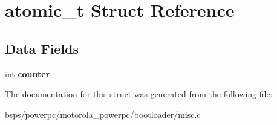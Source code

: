 \hypertarget{structatomic__t}{}\section{atomic\+\_\+t Struct Reference}
\label{structatomic__t}
\subsection*{Data Fields}
\begin{DoxyCompactItemize}
\item 
\mbox{\label{structatomic__t_a777982d8b9b8d7c4f1f41b318da10675}} 
int {\bfseries counter}
\end{DoxyCompactItemize}


The documentation for this struct was generated from the following file\+:\begin{DoxyCompactItemize}
\item 
bsps/powerpc/motorola\+\_\+powerpc/bootloader/misc.\+c\end{DoxyCompactItemize}
